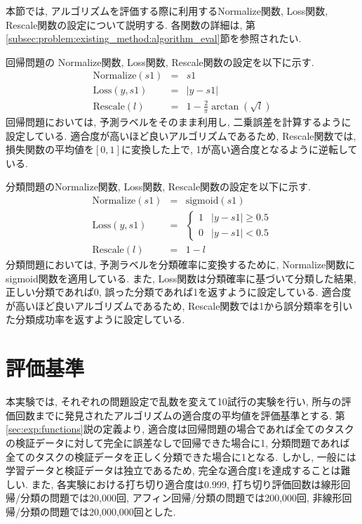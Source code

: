 \documentclass[11pt,oneside,openany,report]{jsbook}
\begin{document}
本節では, アルゴリズムを評価する際に利用するNormalize関数, Loss関数, Rescale関数の設定について説明する. 各関数の詳細は, 第\ref{subsec:problem:existing_method:algorithm_eval}節を参照されたい.

回帰問題の Normalize関数, Loss関数, Rescale関数の設定を以下に示す.
\begin{eqnarray*}
\mathrm{Normalize}(s1) &=& s1 \\
\mathrm{Loss}(y, s1) &=& \left|y - s1\right| \\
\mathrm{Rescale}(l) &=& 1 - \frac{2}{\pi} \arctan\left(\sqrt{l}\right)
\end{eqnarray*}
\noindent
回帰問題においては, 予測ラベルをそのまま利用し, 二乗誤差を計算するように設定している. 適合度が高いほど良いアルゴリズムであるため, Rescale関数では, 損失関数の平均値を$[0,1]$に変換した上で, 1が高い適合度となるように逆転している.

分類問題のNormalize関数, Loss関数, Rescale関数の設定を以下に示す.
\begin{eqnarray*}
\mathrm{Normalize}(s1) &=& \mathrm{sigmoid}(s1) \\
\mathrm{Loss}(y, s1) &=&
\begin{cases}
  1 & |y-s1| \geq 0.5 \\
  0 & |y-s1| < 0.5
\end{cases} \\
\mathrm{Rescale}(l) &=& 1 - l
\end{eqnarray*}
\noindent
分類問題においては, 予測ラベルを分類確率に変換するために, Normalize関数にsigmoid関数を適用している. また, Loss関数は分類確率に基づいて分類した結果, 正しい分類であれば0, 誤った分類であれば1を返すように設定している. 適合度が高いほど良いアルゴリズムであるため, Rescale関数では1から誤分類率を引いた分類成功率を返すように設定している.

\section{評価基準}\label{sec:proposed:exp:eval}

本実験では, それぞれの問題設定で乱数を変えて10試行の実験を行い, 所与の評価回数までに発見されたアルゴリズムの適合度の平均値を評価基準とする. 第\ref{sec:exp:functions}説の定義より, 適合度は回帰問題の場合であれば全てのタスクの検証データに対して完全に誤差なしで回帰できた場合に1, 分類問題であれば全てのタスクの検証データを正しく分類できた場合に1となる. しかし, 一般には学習データと検証データは独立であるため, 完全な適合度1を達成することは難しい. また, 各実験における打ち切り適合度は0.999, 打ち切り評価回数は線形回帰/分類の問題では20,000回, アフィン回帰/分類の問題では200,000回, 非線形回帰/分類の問題では20,000,000回とした.
\end{document}
